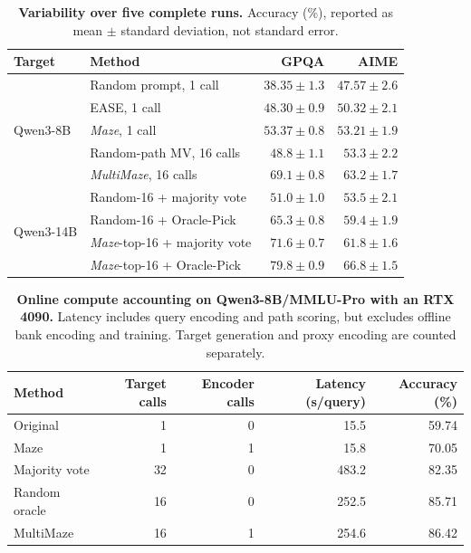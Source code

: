 \begin{table}[htbp]
\centering
\caption{\textbf{Variability over five complete runs.}
Accuracy (\%), reported as mean $\pm$ standard deviation, not standard error.}
\label{tab:run-variability}
\small
\begin{tabular}{@{}llrr@{}}
\toprule
Target & Method & GPQA & AIME\\
\midrule
\multirow{5}{*}{Qwen3-8B}
& Random prompt, 1 call & $38.35\pm1.3$ & $47.57\pm2.6$\\
& EASE, 1 call & $48.30\pm0.9$ & $50.32\pm2.1$\\
& \emph{Maze}, 1 call & $53.37\pm0.8$ & $53.21\pm1.9$\\
& Random-path MV, 16 calls & $48.8\pm1.1$ & $53.3\pm2.2$\\
& \emph{MultiMaze}, 16 calls & $69.1\pm0.8$ & $63.2\pm1.7$\\
\midrule
\multirow{4}{*}{Qwen3-14B}
& Random-16 + majority vote & $51.0\pm1.0$ & $53.5\pm2.1$\\
& Random-16 + Oracle-Pick & $65.3\pm0.8$ & $59.4\pm1.9$\\
& \emph{Maze}-top-16 + majority vote & $71.6\pm0.7$ & $61.8\pm1.6$\\
& \emph{Maze}-top-16 + Oracle-Pick & $79.8\pm0.9$ & $66.8\pm1.5$\\
\bottomrule
\end{tabular}
\end{table}

\begin{table}[htbp]
\caption{\textbf{Online compute accounting on Qwen3-8B/MMLU-Pro with an RTX 4090.}
Latency includes query encoding and path scoring, but excludes offline bank encoding and training.
Target generation and proxy encoding are counted separately.}
\label{tab:compute_accounting_main}
\centering\small
\begin{tabular}{@{}lrrrr@{}}
\toprule
Method & Target calls & Encoder calls & Latency (s/query) & Accuracy (\%)\\ \midrule
Original & 1 & 0 & 15.5 & 59.74\\
Maze & 1 & 1 & 15.8 & 70.05\\
Majority vote & 32 & 0 & 483.2 & 82.35\\
Random oracle & 16 & 0 & 252.5 & 85.71\\
MultiMaze & 16 & 1 & 254.6 & 86.42\\
\bottomrule
\end{tabular}
\vspace{-0.1in}
\end{table}

